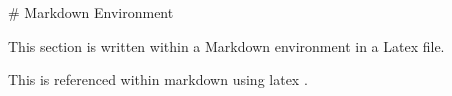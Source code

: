 \documentclass[a4paper,pagesize,oneside,BCOR5mm,headsepline,11pt]{scrartcl}
\begin{document}

\tableofcontents
\vfill

\newpage
{}

\newpage


\newpage
\begin{markdown}

# Markdown Environment

This section is written within a Markdown environment in a Latex file.

This is referenced within markdown using latex \cite{s-mtc-48}.

\end{markdown}

\newpage


\end{document}
